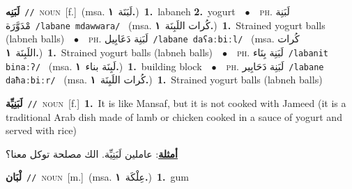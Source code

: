 \documentclass[10pt,a4paper,twoside]{article} %
\begin{document}
\begin{multicols}{2}
{\setlength\topsep{0pt}\textbf{\foreignlanguage{arabic}{لَبَنِه}}\ {\color{gray}\texttt{//}\color{black}}\ \textsc{noun}\ [f.]\ \color{gray}(msa. \foreignlanguage{arabic}{لَبَنَة}~\foreignlanguage{arabic}{\textbf{١.}})\color{black}\ \textbf{1.}~labaneh  \textbf{2.}~yogurt\ \ $\bullet$\ \ \textsc{ph.} \color{gray} \foreignlanguage{arabic}{لَبَنِة مْدَوَّرَة}\color{black}\ {\color{gray}\texttt{/{\sffamily labane mdawwara}/}\color{black}}\ \color{gray} (msa. \foreignlanguage{arabic}{كُرات اللَبِنَة}~\foreignlanguage{arabic}{\textbf{١.}})\color{black}\ \textbf{1.}~Strained yogurt balls (labneh balls)\ \ $\bullet$\ \ \textsc{ph.} \color{gray} \foreignlanguage{arabic}{لَبَنِة دَعَابِيل}\color{black}\ {\color{gray}\texttt{/{\sffamily labane daʕaːbiːl}/}\color{black}}\ \color{gray} (msa. \foreignlanguage{arabic}{كُرات اللَبِنَة}~\foreignlanguage{arabic}{\textbf{١.}})\color{black}\ \textbf{1.}~Strained yogurt balls (labneh balls)\ \ $\bullet$\ \ \textsc{ph.} \color{gray} \foreignlanguage{arabic}{لَبَنِة بِنَاء}\color{black}\ {\color{gray}\texttt{/{\sffamily labanit binaːʔ}/}\color{black}}\ \color{gray} (msa. \foreignlanguage{arabic}{لَبِنَة بناء}~\foreignlanguage{arabic}{\textbf{١.}})\color{black}\ \textbf{1.}~building block\ \ $\bullet$\ \ \textsc{ph.} \color{gray} \foreignlanguage{arabic}{لَبَنِة دَحَابِير}\color{black}\ {\color{gray}\texttt{/{\sffamily labane daħaːbiːr}/}\color{black}}\ \color{gray} (msa. \foreignlanguage{arabic}{كُرات اللَبِنَة}~\foreignlanguage{arabic}{\textbf{١.}})\color{black}\ \textbf{1.}~Strained yogurt balls (labneh balls)\ } \vspace{2mm}

{\setlength\topsep{0pt}\textbf{\foreignlanguage{arabic}{لَبَنِيِّة}}\ {\color{gray}\texttt{//}\color{black}}\ \textsc{noun}\ [f.]\ \textbf{1.}~It is like Mansaf, but it is not cooked with Jameed (it is a traditional Arab dish made of lamb or chicken cooked in a sauce of yogurt and served with rice)\  \begin{flushright}\color{gray}\foreignlanguage{arabic}{\textbf{\underline{\foreignlanguage{arabic}{أمثلة}}}: عاملين لَبَنِيِّة. الك مصلحة توكل معنا؟}\end{flushright}\color{black}} \vspace{2mm}

{\setlength\topsep{0pt}\textbf{\foreignlanguage{arabic}{لْبَان}}\ {\color{gray}\texttt{//}\color{black}}\ \textsc{noun}\ [m.]\ \color{gray}(msa. \foreignlanguage{arabic}{عِلْكَة}~\foreignlanguage{arabic}{\textbf{١.}})\color{black}\ \textbf{1.}~gum\ } \vspace{2mm}


\end{multicols}
\end{document}

